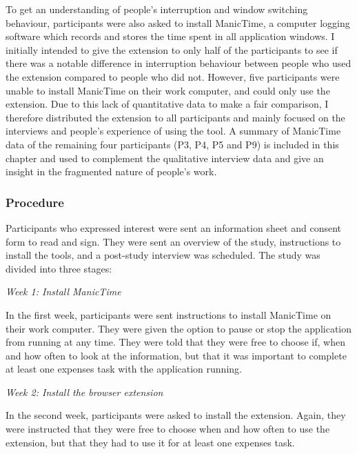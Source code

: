 To get an understanding of people’s interruption and window switching behaviour, participants were also asked to install ManicTime, a computer logging software which records and stores the time spent in all application windows. I initially intended to give the extension to only half of the participants to see if there was a notable difference in interruption behaviour between people who used the extension compared to people who did not. However, five participants were unable to install ManicTime on their work computer, and could only use the extension. Due to this lack of quantitative data to make a fair comparison, I therefore distributed the extension to all participants and mainly focused on the interviews and people’s experience of using the tool. A summary of ManicTime data of the remaining four participants (P3, P4, P5 and P9) is included in this chapter and used to complement the qualitative interview data and give an insight in the fragmented nature of people’s work.

\subsubsection{Procedure}
Participants who expressed interest were sent an information sheet and consent form to read and sign. They were sent an overview of the study, instructions to install the tools, and a post-study interview was scheduled.
The study was divided into three stages:

\textit{Week 1: Install ManicTime}

In the first week, participants were sent instructions to install ManicTime on their work computer. They were given the option to pause or stop the application from running at any time. They were told that they were free to choose if, when and how often to look at the information, but that it was important to complete at least one expenses task with the application running. 

\textit{Week 2: Install the browser extension}

In the second week, participants were asked to install the extension. Again, they were instructed that they were free to choose when and how often to use the extension, but that they had to use it for at least one expenses task. %

